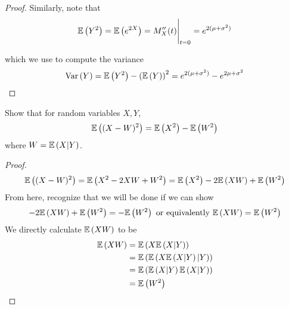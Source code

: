 \documentclass{exam}
\begin{document}
\begin{questions}
\begin{proof}
Similarly, note that
$$\E{Y^2} = \E{e^{2X}} = M_X''(t)\Bigg|_{t = 0} = e^{2(\mu + \sigma^2)}$$

which we use to compute the variance
$$\var{Y} = \E{Y^2} - \paren{\E{Y}}^2 = e^{2(\mu + \sigma^2)} - e^{2\mu + \sigma^2}$$
\end{proof}

\newpage
\question Show that for random variables $X, Y$,
$$\E{(X - W)^2} = \E{X^2} - \E{W^2}$$
where $W = \E{X | Y}$.
\begin{proof}
$$\E{(X - W)^2} = \E{X^2 - 2XW + W^2} = \E{X^2} -2\E{XW} + \E{W^2}$$
From here, recognize that we will be done if we can show
$$-2\E{XW} + \E{W^2} = -\E{W^2} \text{ or equivalently } \E{XW} = \E{W^2}$$
We directly calculate $\E{XW}$ to be
\begin{align*}
    \E{XW} &= \E{X\E{X | Y}} \\
    &= \E{\E{X\E{X | Y} | Y}} \\
    &= \E{\E{X | Y}\E{X | Y}} \\
    &= \E{W^2}
\end{align*}
\end{proof}
\end{questions}
\end{document}
